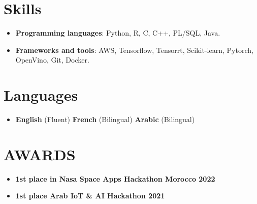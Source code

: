 \documentclass[letterpaper,11pt]{article}
\newcommand{\resumeItem}[2]{
  \item\small{
    \textbf{#1}{#2 \vspace{-2pt}}
  }
}
\newcommand{\resumeSubItem}[2]{\resumeItem{#1}{#2}\vspace{-4pt}}
\newcommand{\resumeSubHeadingListStart}{\begin{itemize}[leftmargin=*]}
\newcommand{\resumeSubHeadingListEnd}{\end{itemize}}
\begin{document}
\section{Skills}
 \resumeSubHeadingListStart
   \item{
     \textbf{Programming languages}{: Python, R, C, C++, PL/SQL, Java.}
   }
   \item{
     \textbf{Frameworks and tools}{: AWS, Tensorflow, Tensorrt, Scikit-learn, Pytorch, OpenVino, Git, Docker.}
     }
 \resumeSubHeadingListEnd

%
\section{Languages}
 \resumeSubHeadingListStart
   \item{
     \textbf{English}{ (Fluent) } \textbf{French}{ (Bilingual) } \textbf{Arabic}{ (Bilingual) }
   }
 \resumeSubHeadingListEnd
\section{AWARDS}
 \resumeSubHeadingListStart
    \resumeSubItem{1st place in Nasa Space Apps Hackathon Morocco 2022}{}
    \resumeSubItem{1st place Arab IoT \& AI Hackathon 2021}{}
 \resumeSubHeadingListEnd
\end{document}
